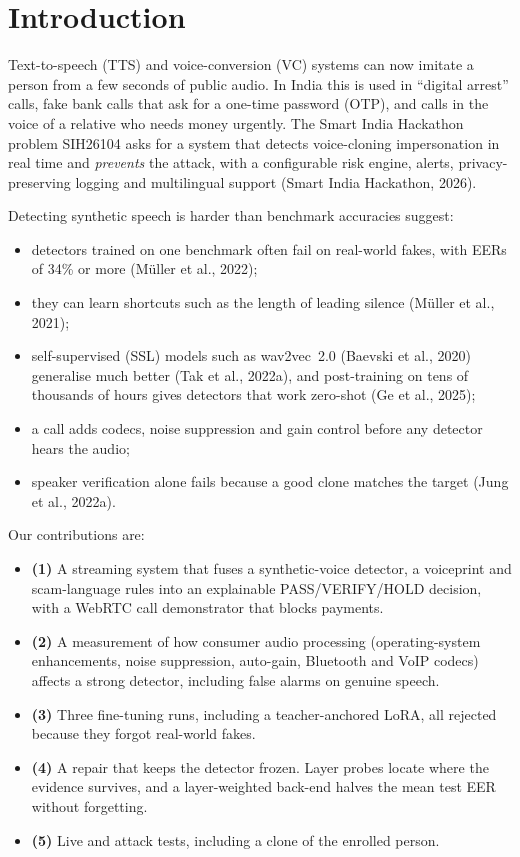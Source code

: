 \documentclass[10pt,a4paper,twocolumn]{article}
\begin{document}
\section{Introduction}
Text-to-speech (TTS) and voice-conversion (VC) systems can now imitate a person from a few seconds of public audio. In India this is used in ``digital arrest'' calls, fake bank calls that ask for a one-time password (OTP), and calls in the voice of a relative who needs money urgently. The Smart India Hackathon problem SIH26104 asks for a system that detects voice-cloning impersonation in real time and \emph{prevents} the attack, with a configurable risk engine, alerts, privacy-preserving logging and multilingual support (Smart India Hackathon, 2026).

Detecting synthetic speech is harder than benchmark accuracies suggest:
\begin{itemize}\setlength\itemsep{0pt}
\item detectors trained on one benchmark often fail on real-world fakes, with EERs of 34\% or more (M\"uller et al., 2022);
\item they can learn shortcuts such as the length of leading silence (M\"uller et al., 2021);
\item self-supervised (SSL) models such as wav2vec~2.0 (Baevski et al., 2020) generalise much better (Tak et al., 2022a), and post-training on tens of thousands of hours gives detectors that work zero-shot (Ge et al., 2025);
\item a call adds codecs, noise suppression and gain control before any detector hears the audio;
\item speaker verification alone fails because a good clone matches the target (Jung et al., 2022a).
\end{itemize}

Our contributions are:
\begin{itemize}\setlength\itemsep{0pt}
\item \textbf{(1)} A streaming system that fuses a synthetic-voice detector, a voiceprint and scam-language rules into an explainable PASS/VERIFY/HOLD decision, with a WebRTC call demonstrator that blocks payments.
\item \textbf{(2)} A measurement of how consumer audio processing (operating-system enhancements, noise suppression, auto-gain, Bluetooth and VoIP codecs) affects a strong detector, including false alarms on genuine speech.
\item \textbf{(3)} Three fine-tuning runs, including a teacher-anchored LoRA, all rejected because they forgot real-world fakes.
\item \textbf{(4)} A repair that keeps the detector frozen. Layer probes locate where the evidence survives, and a layer-weighted back-end halves the mean test EER without forgetting.
\item \textbf{(5)} Live and attack tests, including a clone of the enrolled person.
\end{itemize}
\end{document}
